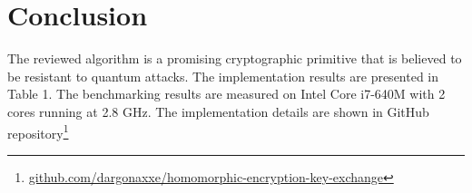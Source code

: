 \section{Conclusion}
	The reviewed algorithm is a promising cryptographic primitive that is believed to be resistant to quantum attacks. The implementation results are presented in Table 1. The benchmarking results are measured on Intel Core i7-640M with 2 cores running at 2.8 GHz. The implementation details are shown in GitHub repository\footnote{\href{https://github.com/dargonaxxe/homomorphic-encryption-key-exchange}{github.com/dargonaxxe/homomorphic-encryption-key-exchange}}